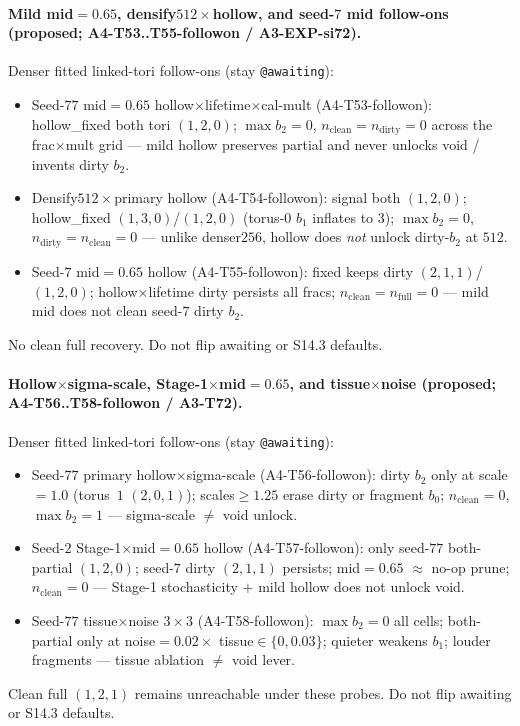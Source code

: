 \documentclass[11pt]{article}
\begin{document}
\paragraph{Mild mid${=}0.65$, densify$512\times$hollow, and seed-$7$ mid
follow-ons (proposed; A4-T53..T55-followon / A3-EXP-si72).}
Denser fitted linked-tori follow-ons (stay \texttt{@awaiting}):
\begin{itemize}[leftmargin=1.5em]
  \item Seed-$77$ mid${=}0.65$ hollow$\times$lifetime$\times$cal-mult
  (A4-T53-followon): hollow\_fixed both tori $(1,2,0)$;
  $\max b_2{=}0$, $n_{\mathrm{clean}}{=}n_{\mathrm{dirty}}{=}0$ across the
  frac$\times$mult grid --- mild hollow preserves partial and never
  unlocks void / invents dirty $b_2$.
  \item Densify$512\times$primary hollow (A4-T54-followon): signal both
  $(1,2,0)$; hollow\_fixed $(1,3,0)$/$(1,2,0)$ (torus-$0$ $b_1$ inflates
  to $3$); $\max b_2{=}0$, $n_{\mathrm{dirty}}{=}n_{\mathrm{clean}}{=}0$
  --- unlike denser$256$, hollow does \emph{not} unlock dirty-$b_2$ at
  $512$.
  \item Seed-$7$ mid${=}0.65$ hollow (A4-T55-followon): fixed keeps dirty
  $(2,1,1)$/$(1,2,0)$; hollow$\times$lifetime dirty persists all fracs;
  $n_{\mathrm{clean}}{=}n_{\mathrm{full}}{=}0$ --- mild mid does not clean
  seed-$7$ dirty $b_2$.
\end{itemize}
No clean full recovery. Do not flip awaiting or S14.3 defaults.

\paragraph{Hollow$\times$sigma-scale, Stage-1$\times$mid${=}0.65$, and
tissue$\times$noise (proposed; A4-T56..T58-followon / A3-T72).}
Denser fitted linked-tori follow-ons (stay \texttt{@awaiting}):
\begin{itemize}[leftmargin=1.5em]
  \item Seed-$77$ primary hollow$\times$sigma-scale (A4-T56-followon):
  dirty $b_2$ only at scale${=}1.0$ (torus~$1$ $(2,0,1)$);
  scales$\ge 1.25$ erase dirty or fragment $b_0$;
  $n_{\mathrm{clean}}{=}0$, $\max b_2{=}1$ --- sigma-scale $\neq$ void
  unlock.
  \item Seed-$2$ Stage-1$\times$mid${=}0.65$ hollow (A4-T57-followon):
  only seed-$77$ both-partial $(1,2,0)$; seed-$7$ dirty $(2,1,1)$
  persists; mid${=}0.65$ $\approx$ no-op prune; $n_{\mathrm{clean}}{=}0$
  --- Stage-1 stochasticity $+$ mild hollow does not unlock void.
  \item Seed-$77$ tissue$\times$noise $3\times 3$ (A4-T58-followon):
  $\max b_2{=}0$ all cells; both-partial only at noise${=}0.02\times$
  tissue$\in\{0,0.03\}$; quieter weakens $b_1$; louder fragments ---
  tissue ablation $\neq$ void lever.
\end{itemize}
Clean full $(1,2,1)$ remains unreachable under these probes. Do not flip
awaiting or S14.3 defaults.
\end{document}
